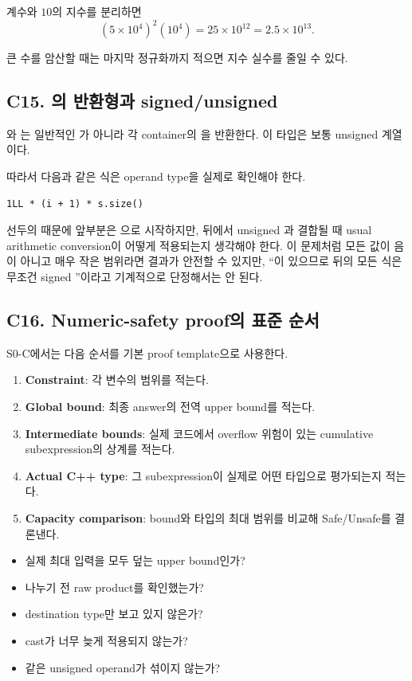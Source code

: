 계수와 $10$의 지수를 분리하면
\[
(5\times10^4)^2(10^4)
=25\times10^{12}
=2.5\times10^{13}.
\]

큰 수를 암산할 때는 마지막 정규화까지 적으면 지수 실수를 줄일 수 있다.

\subsection{C15. 의 반환형과 signed/unsigned}
와 는 일반적인 가 아니라 각 container의 을 반환한다. 이 타입은 보통 unsigned 계열이다.

따라서 다음과 같은 식은 operand type을 실제로 확인해야 한다.
\begin{lstlisting}
1LL * (i + 1) * s.size()
\end{lstlisting}

선두의  때문에 앞부분은 으로 시작하지만, 뒤에서 unsigned 과 결합될 때 usual arithmetic conversion이 어떻게 적용되는지 생각해야 한다. 이 문제처럼 모든 값이 음이 아니고 매우 작은 범위라면 결과가 안전할 수 있지만, ``이 있으므로 뒤의 모든 식은 무조건 signed ''이라고 기계적으로 단정해서는 안 된다.

\subsection{C16. Numeric-safety proof의 표준 순서}
S0-C에서는 다음 순서를 기본 proof template으로 사용한다.
\begin{enumerate}
  \item \textbf{Constraint}: 각 변수의 범위를 적는다.
  \item \textbf{Global bound}: 최종 answer의 전역 upper bound를 적는다.
  \item \textbf{Intermediate bounds}: 실제 코드에서 overflow 위험이 있는 cumulative subexpression의 상계를 적는다.
  \item \textbf{Actual C++ type}: 그 subexpression이 실제로 어떤 타입으로 평가되는지 적는다.
  \item \textbf{Capacity comparison}: bound와 타입의 최대 범위를 비교해 Safe/Unsafe를 결론낸다.
\end{enumerate}

\begin{checklistbox}
\begin{itemize}
  \item[$\square$] 실제 최대 입력을 모두 덮는 upper bound인가?
  \item[$\square$] 나누기 전 raw product를 확인했는가?
  \item[$\square$] destination type만 보고 있지 않은가?
  \item[$\square$] cast가 너무 늦게 적용되지 않는가?
  \item[$\square$]  같은 unsigned operand가 섞이지 않는가?
\end{itemize}
\end{checklistbox}

